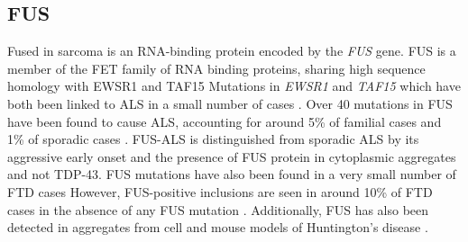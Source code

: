 %
%
%
%
%






\subsection{FUS}

Fused in sarcoma is an RNA-binding protein encoded by the \textit{FUS} gene. 
FUS is a member of the FET family of RNA binding proteins, sharing high sequence homology with EWSR1 and TAF15 \citep{Kovar2011}
Mutations in \textit{EWSR1} and \textit{TAF15} which have both been linked to ALS in a small number of cases \citep{Neumann2011, Couthouis2011,Ticozzi2011-bs,Couthouis2012}.
Over 40 mutations in FUS have been found to cause ALS, accounting for around 5\% of familial cases and 1\% of sporadic cases \citep{Vance2009-ye}. 
FUS-ALS is distinguished from sporadic ALS by its aggressive early onset and the presence of FUS protein in cytoplasmic aggregates and not TDP-43. 
FUS mutations have also been found in a very small number of FTD cases \citep{VanLangenhove2010,Broustal2010}
However, FUS-positive inclusions are seen in around 10\% of FTD cases in the absence of any FUS mutation \citep{Neumann2009}. 
Additionally, FUS has also been detected in aggregates from cell and mouse models of Huntington's disease \citep{Doi2008, Kino2016}.


